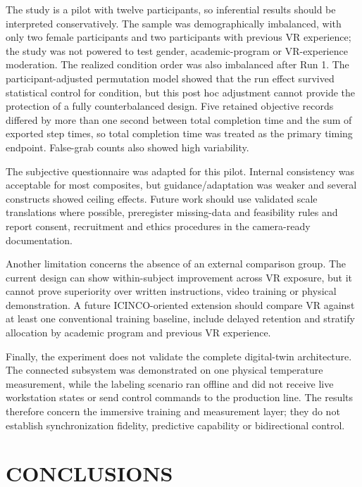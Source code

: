 \documentclass[a4paper,twoside]{article}
\begin{document}
The study is a pilot with twelve participants, so inferential results should be interpreted conservatively. The sample was demographically imbalanced, with only two female participants and two participants with previous VR experience; the study was not powered to test gender, academic-program or VR-experience moderation. The realized condition order was also imbalanced after Run 1. The participant-adjusted permutation model showed that the run effect survived statistical control for condition, but this post hoc adjustment cannot provide the protection of a fully counterbalanced design. Five retained objective records differed by more than one second between total completion time and the sum of exported step times, so total completion time was treated as the primary timing endpoint. False-grab counts also showed high variability.

The subjective questionnaire was adapted for this pilot. Internal consistency was acceptable for most composites, but guidance/adaptation was weaker and several constructs showed ceiling effects. Future work should use validated scale translations where possible, preregister missing-data and feasibility rules and report consent, recruitment and ethics procedures in the camera-ready documentation.

Another limitation concerns the absence of an external comparison group. The current design can show within-subject improvement across VR exposure, but it cannot prove superiority over written instructions, video training or physical demonstration. A future ICINCO-oriented extension should compare VR against at least one conventional training baseline, include delayed retention and stratify allocation by academic program and previous VR experience.

Finally, the experiment does not validate the complete digital-twin architecture. The connected subsystem was demonstrated on one physical temperature measurement, while the labeling scenario ran offline and did not receive live workstation states or send control commands to the production line. The results therefore concern the immersive training and measurement layer; they do not establish synchronization fidelity, predictive capability or bidirectional control.

\section{\uppercase{Conclusions}}
\label{sec:conclusion}
\end{document}
